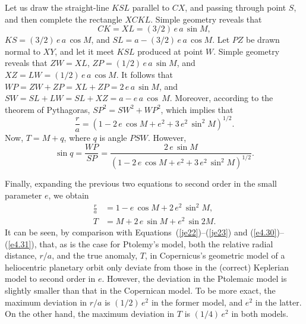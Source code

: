 Let us draw the straight-line $KSL$ parallel to $CX$, and passing through point $S$, and then complete the rectangle $XCKL$. Simple geometry reveals that 
$$CK = XL = (3/2)\,e\,a\,\sin M,$$ $KS=(3/2)\,e\,a\,\cos M$, and  $SL = a-(3/2)\,e\,a\,\cos M$. Let $PZ$ be drawn normal
to $XY$, and let it meet $KSL$ produced at point $W$. Simple geometry reveals that $ZW=XL$,  $ZP=(1/2)\,e\,a\,\sin M$, and $XZ =LW = (1/2)\,e\,a\,\cos M$. It follows that $WP = ZW+ZP = XL+ZP = 2\,e\,a\,\sin M$, and $SW = SL+LW=SL+XZ= a-e\,a\,\cos\,M$.
Moreover, according to the theorem of Pythagoras,  $SP^2 = SW^2+ WP^2$,
which implies that
\begin{equation}
\frac{r}{a} = (1-2\,e\,\cos M +e^2+3\,e^2\,\sin^2 M)^{1/2}.
\end{equation}
Now, $T = M + q$, where $q$ is angle $PSW$. However,
\begin{equation}
\sin q = \frac{WP}{SP} = \frac{2\,e\,\sin M}{(1-2\,e\,\cos M +e^2+3\,e^2\,\sin^2 M)^{1/2}}.
\end{equation}

Finally, expanding the previous two equations to second order in the small parameter $e$, we obtain
\begin{align}
\frac{r}{a} &= 1 -e\,\cos M + 2\,e^2\,\sin^2 M,\\[0.5ex]
T &= M + 2\,e\,\sin M + e^2\,\sin 2M.
\end{align}
It can be seen, by comparison with Equations~(\ref{je22})--(\ref{je23}) and (\ref{e4.30})--(\ref{e4.31}), that, as is the case for Ptolemy's  model, both the 
relative radial distance, $r/a$,  and the true anomaly, $T$, in Copernicus's geometric model of a heliocentric planetary orbit only deviate from those in the (correct) Keplerian model to  second order  in $e$. However, the deviation  in the Ptolemaic
model is  slightly smaller  than that in the Copernican model. To be more exact, the maximum deviation in $r/a$
is $(1/2)\,e^2$ in the former model, and $e^2$ in the latter. On the other hand, the maximum deviation in $T$ is $(1/4)\,e^2$
in both models.